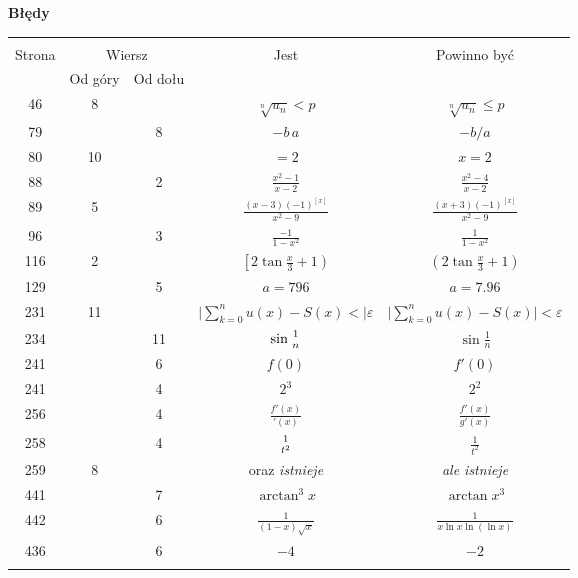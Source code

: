 \documentclass[a4paper,11pt]{article}
\newcommand{\fr}{\frac}
\newcommand{\Sum}{\sum\limits}
\newcommand{\veps}{\varepsilon}
\newcommand{\tb}{\textbf}
\newcommand{\Center}[1]{\begin{center} #1 \end{center}}
\newcommand{\CenterTB}[1]{\Center{\tb{#1}}}
\begin{document}
\CenterTB{Błędy}
\begin{center}
  \begin{tabular}{|c|c|c|c|c|}
    \hline
    & \multicolumn{2}{c|}{} & & \\
    Strona & \multicolumn{2}{c|}{Wiersz}& Jest & Powinno być \\ \cline{2-3}
    & Od góry & Od dołu &  &  \\ \hline
    46 & 8 & & $\sqrt[n]{ u_{ n } } < p$ & $\sqrt[n]{ u_{ n } } \leq p$ \\
    79 & & 8 & $-b \, a$ & $-b / a$ \\
    80 & 10 & & $= 2$ & $x = 2$ \\
    88 & & 2 & $\fr{ x^{ 2 } - 1 }{ x - 2 }$ & $\fr{ x^{ 2 } - 4 }
                                               { x - 2 }$ \\
    89 & 5 & & $\fr{ ( x - 3 )( -1 )^{ [ x ] } }{ x^{ 2 } - 9 }$
           & $\fr{ ( x + 3 )( -1 )^{ [ x ] } }{ x^{ 2 } - 9 }$ \\
    96 & & 3 & $\fr{ -1 }{ 1 - x^{ 2 } }$
           & $\fr{ 1 }{ 1 - x^{ 2 } }$ \\
    116 & 2 & & $\left[ 2 \tan \fr{ x }{ 3 } + 1 \right)$
           & $ \left( 2 \tan \fr{ x }{ 3 } + 1 \right)$ \\
    129 & & 5 & $a = 796$ & $a = 7.96$ \\
    231 & 11 & & $\bigg| \Sum_{ k = 0 }^{ n } u( x ) - S( x ) < \bigg|
                 \veps$
           & $\bigg| \Sum_{ k = 0 }^{ n } u( x )
             - S( x ) \bigg| < \veps$ \\
    234 & & 11 & $\sin{ 1 \atop n }$ & $\sin \fr{ 1 }{ n }$ \\
    241 & & 6 & $f( 0 )$ & $f'( 0 )$ \\
    241 & & 4 & $2^{ 3 }$ & $2^{ 2 }$ \\
    256 & & 4 & $\fr{ f'( x ) }{ {}'( x ) }$ & $\fr{ f'( x ) }
                                               { g'( x ) }$ \\
    258 & & 4 & ${ 1 \atop t^{ 2 } }$ & $\fr{ 1 }{ t^{ 2 } }$ \\
    259 & 8 & & oraz \emph{istnieje} & \emph{ale istnieje} \\
    441 & & 7 & $\arctan^{ 3 }x$ & $\arctan x^{ 3 }$ \\
    442 & & 6 & $\fr{ 1 }{ ( 1 - x ) \sqrt{ x } }$
           & $\fr{ 1 }{ x \ln x \ln( \ln x ) }$ \\
    436 & & 6  & $-4$ & $-2$ \\
    & & & & \\ \hline
  \end{tabular}
\end{center}
\end{document}
